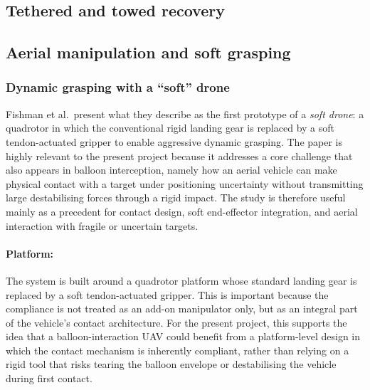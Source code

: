 \subsection{ Tethered and towed recovery}







\subsection{ Aerial manipulation and soft grasping}



\subsubsection{Dynamic grasping with a “soft” drone}
Fishman et al.\ present what they describe as the first prototype of a \emph{soft drone}: a quadrotor in which the conventional rigid landing gear is replaced by a soft tendon-actuated gripper to enable aggressive dynamic grasping. The paper is highly relevant to the present project because it addresses a core challenge that also appears in balloon interception, namely how an aerial vehicle can make physical contact with a target under positioning uncertainty without transmitting large destabilising forces through a rigid impact. The study is therefore useful mainly as a precedent for contact design, soft end-effector integration, and aerial interaction with fragile or uncertain targets. \cite{Fishman2021DynamicPractice}

\paragraph{Platform:} The system is built around a quadrotor platform whose standard landing gear is replaced by a soft tendon-actuated gripper. This is important because the compliance is not treated as an add-on manipulator only, but as an integral part of the vehicle’s contact architecture. For the present project, this supports the idea that a balloon-interaction UAV could benefit from a platform-level design in which the contact mechanism is inherently compliant, rather than relying on a rigid tool that risks tearing the balloon envelope or destabilising the vehicle during first contact. \cite{Fishman2021DynamicPractice}

